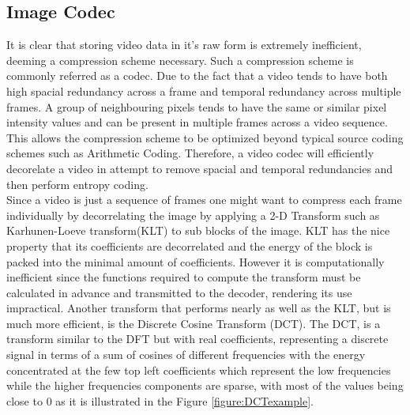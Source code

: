 \documentclass[a4paper,11pt,oneside]{article}
\begin{document}
\subsection{Image Codec}
\indent It is clear that storing video data in it's raw form is extremely inefficient, deeming a compression scheme necessary. Such a compression scheme is commonly referred as a codec.
Due to the fact that a video tends to have both high spacial redundancy across a frame and temporal redundancy across multiple frames. A group of neighbouring pixels tends to have
the same or similar pixel intensity values and can be present in multiple frames across a video sequence. This allows the compression scheme to be optimized beyond typical source coding
schemes such as Arithmetic Coding. Therefore, a video codec will efficiently decorelate a video in attempt to remove spacial and temporal redundancies and then perform entropy coding.\\
\indent %
Since a video is just a sequence of frames one might want to compress each frame individually by decorrelating the image by applying a 2-D Transform such as Karhunen-Loeve transform(KLT) to sub blocks of the image. KLT has the nice property that its coefficients are decorrelated and the energy of the block is packed into the minimal amount of coefficients. However it is computationally inefficient since the functions required to compute the transform must be calculated in advance and transmitted to the decoder, rendering its use impractical. Another transform that performs nearly as well as the KLT, but is much more efficient, is the Discrete Cosine Transform (DCT). The DCT, is a transform similar to the DFT but with real
coefficients, representing a discrete signal in terms of a sum of cosines of different frequencies with the energy concentrated at the few top left coefficients which represent the low frequencies while the higher frequencies components are sparse, with most of the values being close to $0$ as it is illustrated in the Figure \ref{figure:DCTexample}.
\end{document}
